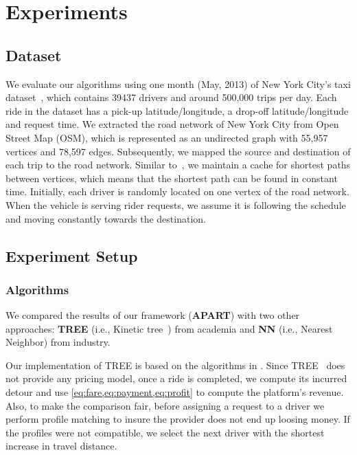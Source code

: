 \vspace{-1mm}
\section{Experiments}
\vspace{-1mm}
\label{sec:exp}


\subsection{Dataset}
We evaluate our algorithms using one month (May, 2013) of  New York City's taxi dataset~\cite{nyc}, which contains 39437 drivers and around 500,000 trips per day. Each ride in the dataset has a pick-up latitude/longitude, a drop-off latitude/longitude and request time. We extracted the road network of New York City from Open Street Map (OSM), which is represented as an undirected graph with 55,957 vertices and 78,597 edges. Subsequently, we mapped the source and destination of each trip to the road network. Similar to~\cite{Huang14}, we maintain a cache for shortest paths between vertices, which means that the shortest path can be found in constant time. Initially, each driver is randomly located on one vertex of the road network. When the vehicle is serving rider requests, we assume it is following the schedule and moving constantly towards the destination.

\subsection{Experiment Setup}

\subsubsection{Algorithms}
\label{subsec:expalgo}
We compared the results of our framework (\textbf{APART}) with two other approaches: \textbf{TREE} (i.e., Kinetic tree~\cite{Huang14}) from academia and \textbf{NN} (i.e., Nearest Neighbor) from industry.

Our implementation of TREE is based on the algorithms in \cite{Huang14}. Since TREE~\cite{Huang14} does not provide any pricing model, once a ride is completed, we compute its incurred detour and use \cref{eq:fare,eq:payment,eq:profit} to compute the platform's revenue. Also, to make the comparison fair, before assigning a request to a driver we perform profile matching to insure the provider does not end up loosing money. If the profiles were not compatible, we select the next driver with the shortest increase in travel distance.

